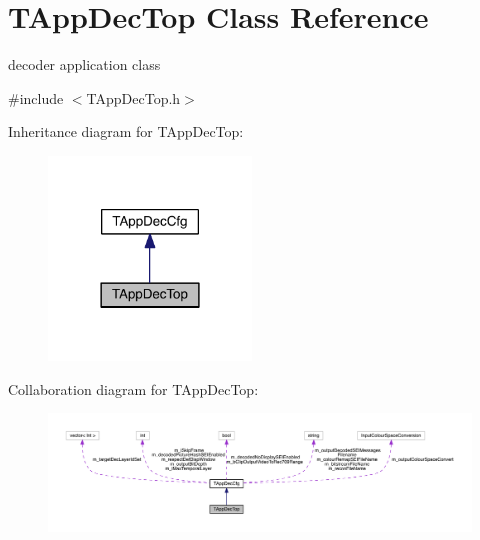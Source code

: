 \hypertarget{class_t_app_dec_top}{}\section{T\+App\+Dec\+Top Class Reference}
\label{class_t_app_dec_top}


decoder application class  




{\ttfamily \#include $<$T\+App\+Dec\+Top.\+h$>$}



Inheritance diagram for T\+App\+Dec\+Top\+:
\nopagebreak
\begin{figure}[H]
\begin{center}
\leavevmode
\includegraphics[width=153pt]{db/ded/class_t_app_dec_top__inherit__graph}
\end{center}
\end{figure}


Collaboration diagram for T\+App\+Dec\+Top\+:
\nopagebreak
\begin{figure}[H]
\begin{center}
\leavevmode
\includegraphics[width=350pt]{d8/dd7/class_t_app_dec_top__coll__graph}
\end{center}
\end{figure}

